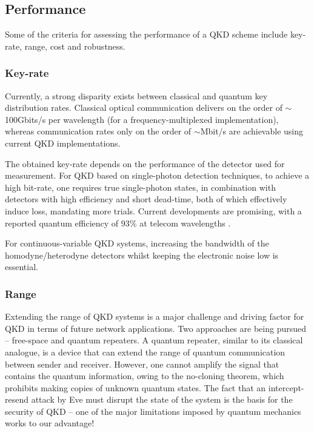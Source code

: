 \subsection{Performance}

Some of the criteria for assessing the performance of a QKD scheme include key-rate, range, cost and robustness.

\subsubsection{Key-rate}

Currently, a strong disparity exists between classical and quantum key distribution rates. Classical optical communication delivers on the order of $\sim$100Gbits/s per wavelength (for a frequency-multiplexed implementation), whereas communication rates only on the order of $\sim$Mbit/s are achievable using current QKD implementations.

The obtained key-rate depends on the performance of the detector used for measurement. For QKD based on single-photon detection techniques, to achieve a high bit-rate, one requires true single-photon states, in combination with detectors with high efficiency and short dead-time, both of which effectively induce loss, mandating more trials. Current developments are promising, with a reported quantum efficiency of $93\%$ at telecom wavelengths \cite{bib:marsili2013detecting}.

For continuous-variable QKD systems, increasing the bandwidth of the homodyne/heterodyne detectors whilst keeping the electronic noise low is essential.

\subsubsection{Range}

Extending the range of QKD systems is a major challenge and driving factor for QKD in terms of future network applications. Two approaches are being pursued -- free-space and quantum repeaters. A quantum repeater, similar to its classical analogue, is a device that can extend the range of quantum communication between sender and receiver. However, one cannot amplify the signal that contains the quantum information, owing to the no-cloning theorem, which prohibits making copies of unknown quantum states. The fact that an intercept-resend attack by Eve must disrupt the state of the system is the basis for the security of QKD -- one of the major limitations imposed by quantum mechanics works to our advantage!

